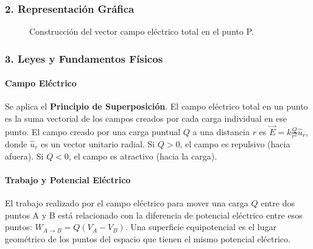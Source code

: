\subsubsection*{2. Representación Gráfica}
\begin{figure}[H]
    \centering
    \caption{Construcción del vector campo eléctrico total en el punto P.}
\end{figure}

\subsubsection*{3. Leyes y Fundamentos Físicos}
\paragraph*{Campo Eléctrico}
Se aplica el \textbf{Principio de Superposición}. El campo eléctrico total en un punto es la suma vectorial de los campos creados por cada carga individual en ese punto. El campo creado por una carga puntual $Q$ a una distancia $r$ es $\vec{E} = k \frac{Q}{r^2} \hat{u}_r$, donde $\hat{u}_r$ es un vector unitario radial. Si $Q>0$, el campo es repulsivo (hacia afuera). Si $Q<0$, el campo es atractivo (hacia la carga).

\paragraph*{Trabajo y Potencial Eléctrico}
El trabajo realizado por el campo eléctrico para mover una carga $Q$ entre dos puntos A y B está relacionado con la diferencia de potencial eléctrico entre esos puntos: $W_{A \to B} = Q (V_A - V_B)$. Una superficie equipotencial es el lugar geométrico de los puntos del espacio que tienen el mismo potencial eléctrico.

